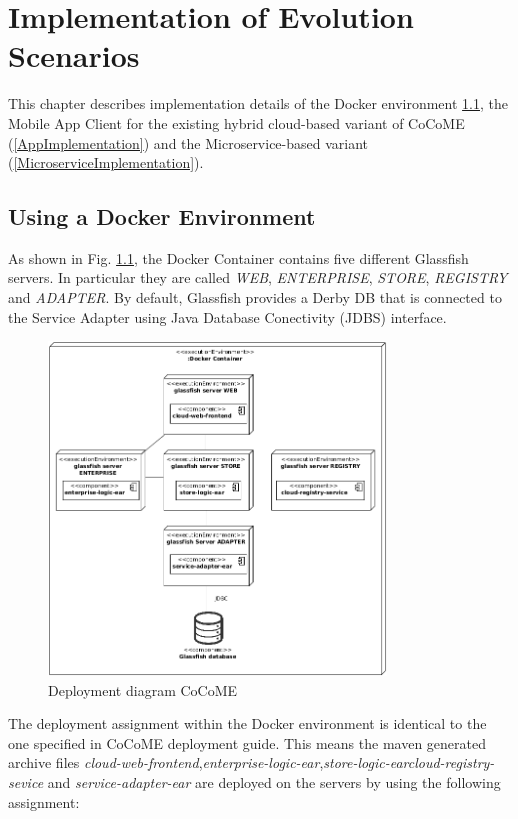 \chapter{Implementation of Evolution Scenarios}
\label{c:implementation}
This chapter describes implementation details of the Docker environment \ref{DockerImplementation}, the Mobile App Client for the existing hybrid cloud-based variant of CoCoME (\ref{AppImplementation}) and the Microservice-based variant (\ref{MicroserviceImplementation}).


\section{Using a Docker Environment}\label{DockerImplementation}
 	As shown in Fig. \ref*{Deploym_CoCoME}, the Docker Container contains five different Glassfish servers. In particular they are called \textit{WEB}, \textit{ENTERPRISE}, \textit{STORE}, \textit{REGISTRY} and \textit{ADAPTER}. By default, Glassfish provides a Derby DB that is connected to the Service Adapter using Java Database Conectivity (JDBS) interface.
 	\begin{figure}[h]
 		\centering
 		\includegraphics[width = 0.8\textwidth]{img/docker_Container_Deployment.png}
 		\caption{Deployment diagram CoCoME}
 		\label{Deploym_CoCoME}
 	\end{figure}
 	\noindent
 	The deployment assignment within the Docker environment is identical to the one specified in CoCoME deployment guide.
 	This means the maven generated archive files \textit{cloud-web-frontend},\textit{enterprise-logic-ear},\textit{store-logic-ear}\textit{cloud-registry-sevice} and \textit{service-adapter-ear} are deployed on the servers by using the following assignment:
